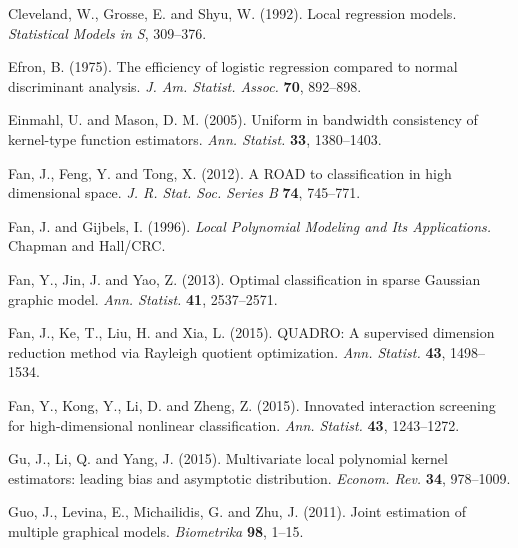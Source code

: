 \documentclass[11pt]{article}
\theoremstyle{definition}
\begin{document}
\begin{thebibliography}{}
 	{Cleveland, W., Grosse, E.} and {Shyu, W.} (1992).
 	{Local regression models}.
 	\textit{Statistical Models in S}, 309--376.
 	
 	
 	{Efron, B.} (1975). The efficiency of logistic regression compared to normal discriminant analysis.
 	{\it J. Am. Statist. Assoc.} {\bf 70}, 892--898.
 	
 	{Einmahl, U.} and {Mason, D. M.} (2005).
 	{Uniform in bandwidth consistency of kernel-type function estimators}.
 	\textit{Ann. Statist.} {\bf 33}, 1380--1403.
 	
 	{Fan, J.}, {Feng, Y.} and {Tong, X.} (2012).
 	{A ROAD to classification in high dimensional space.}
 	\textit{J. R. Stat. Soc. Series B} {\bf 74}, 745--771.
 	
 	{Fan, J.} and {Gijbels, I.} (1996).
 	\textit{Local Polynomial Modeling and Its Applications.} Chapman and
 	Hall/CRC.
 	
 	
 	{Fan, Y., Jin, J.} and {Yao, Z.} (2013).
 	Optimal classification in sparse Gaussian graphic model.
 	\textit{Ann. Statist.} {\bf 41}, 2537--2571.
 	
 	{Fan, J., Ke, T., Liu, H.} and {Xia, L.} (2015).
 	QUADRO: A supervised dimension reduction method via Rayleigh quotient optimization.
 	\textit{Ann. Statist.} {\bf 43}, 1498--1534.
 	
 	
 	{Fan, Y., Kong, Y., Li, D.} and {Zheng, Z.} (2015).
 	Innovated interaction screening for high-dimensional nonlinear classification.
 	\textit{Ann. Statist.} {\bf 43}, 1243--1272.
 	
 	{Gu, J.}, {Li, Q.} and {Yang, J.} (2015).
 	{Multivariate local polynomial kernel estimators: leading bias and asymptotic distribution.}
 	\textit{Econom. Rev.} {\bf 34}, 978--1009.
 	
 	
 	
 	{Guo, J.}, {Levina, E.}, {Michailidis, G.} and {Zhu, J.} (2011).
 	{Joint estimation of multiple graphical models.}
 	\textit{Biometrika} {\bf 98}, 1--15.
 	

\end{thebibliography}
\end{document}
